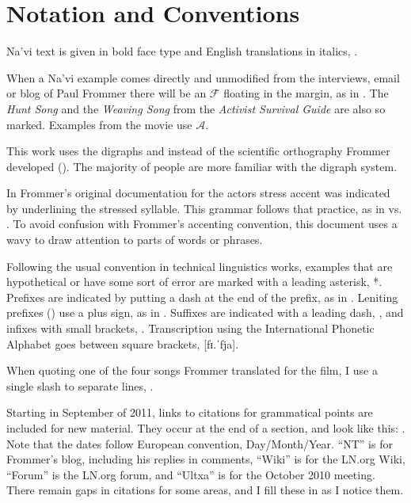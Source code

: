 \section{Notation and Conventions}

Na'vi text is given in bold face type and English translations in
italics,  .

When a Na'vi example comes directly and unmodified from the
interviews, email or blog of Paul Frommer there will be an
$\mathcal{F}$ floating in the margin, as in .  The
\textit{Hunt Song} and the \textit{Weaving Song} from the
\textit{Activist Survival Guide} are also so marked.  Examples from
the movie use $\mathcal{A}$.

This work uses the digraphs  and  instead of the
scientific orthography Frommer developed ().  The
majority of people are more familiar with the digraph system.

In Frommer's original documentation for the actors stress accent was
indicated by underlining the stressed syllable.  This grammar follows
that practice, as in   vs. 
.  To avoid confusion with Frommer's accenting convention,
this document uses a wavy  to draw attention to parts
of words or phrases.

Following the usual convention in technical linguistics works,
examples that are hypothetical or have some sort of error are marked
with a leading asterisk, *.  Prefixes are indicated by
putting a dash at the end of the prefix, as in .  Leniting
prefixes () use a plus sign, as in .
Suffixes are indicated with a leading dash, , and infixes with
small brackets, .  Transcription using the International
Phonetic Alphabet goes between square brackets, [fɪ.ˈfja].

When quoting one of the four songs Frommer translated for the film, I
use a single slash to separate lines, .

Starting in September of 2011, links to citations for grammatical
points are included for new material.  They occur at the end of a
section, and look like this:
.
Note that the dates follow European convention, Day/Month/Year.
``NT'' is for Frommer's blog, including his replies in comments,
``Wiki'' is for the LN.org Wiki, ``Forum'' is the LN.org forum, and
``Ultxa'' is for the October 2010 meeting.  There remain gaps in
citations for some areas, and I fill these in as I notice them.

